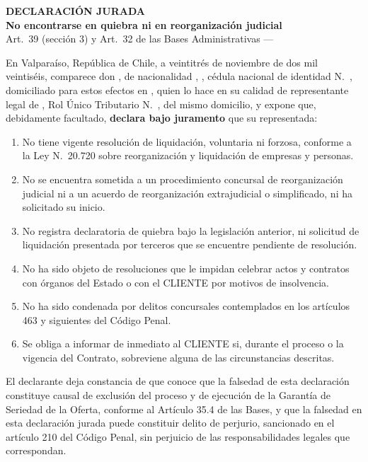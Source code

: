 \documentclass[11pt]{article}
\begin{document}
\begin{center}
  {\Large\bfseries DECLARACIÓN JURADA}\\[6pt]
  {\bfseries No encontrarse en quiebra ni en reorganización judicial}\\[4pt]
  {\small Art.~39\textdegree{} (sección 3) y Art.~32\textdegree{} de las Bases Administrativas --- \LFXlicitacion}
\end{center}

\noindent En Valparaíso, República de Chile, a veintitrés de noviembre de dos mil veintiséis, comparece don \textbf{\LFXrepresentante}, de nacionalidad \SIMnacionalidad, \SIMprofesion, cédula nacional de identidad N.\textdegree~\SIMrunrepresentante, domiciliado para estos efectos en \LFXdomicilio, quien lo hace en su calidad de representante legal de \textbf{\LFXempresa}, Rol Único Tributario N.\textdegree~\LFXrut, del mismo domicilio, y expone que, debidamente facultado, \textbf{declara bajo juramento} que su representada:

\begin{enumerate}[label=\arabic*.,leftmargin=2em,itemsep=2pt]
  \item No tiene vigente resolución de liquidación, voluntaria ni forzosa, conforme a la Ley N.\textdegree~20.720 sobre reorganización y liquidación de empresas y personas.
  \item No se encuentra sometida a un procedimiento concursal de reorganización judicial ni a un acuerdo de reorganización extrajudicial o simplificado, ni ha solicitado su inicio.
  \item No registra declaratoria de quiebra bajo la legislación anterior, ni solicitud de liquidación presentada por terceros que se encuentre pendiente de resolución.
  \item No ha sido objeto de resoluciones que le impidan celebrar actos y contratos con órganos del Estado o con el CLIENTE por motivos de insolvencia.
  \item No ha sido condenada por delitos concursales contemplados en los artículos 463 y siguientes del Código Penal.
  \item Se obliga a informar de inmediato al CLIENTE si, durante el proceso o la vigencia del Contrato, sobreviene alguna de las circunstancias descritas.
\end{enumerate}

\noindent El declarante deja constancia de que conoce que la falsedad de esta declaración constituye causal de exclusión del proceso y de ejecución de la Garantía de Seriedad de la Oferta, conforme al Artículo 35.4 de las Bases, y que la falsedad en esta declaración jurada puede constituir delito de perjurio, sancionado en el artículo 210 del Código Penal, sin perjuicio de las responsabilidades legales que correspondan.
\end{document}
